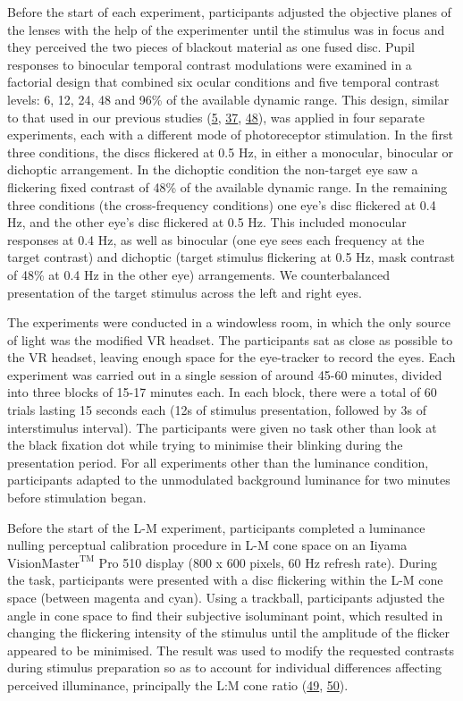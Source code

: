 \documentclass[
]{article}
\begin{document}
Before the start of each experiment, participants adjusted the objective planes of the lenses with the help of the experimenter until the stimulus was in focus and they perceived the two pieces of blackout material as one fused disc. Pupil responses to binocular temporal contrast modulations were examined in a factorial design that combined six ocular conditions and five temporal contrast levels: 6, 12, 24, 48 and 96\% of the available dynamic range. This design, similar to that used in our previous studies (\protect\hyperlink{ref-Segala2023}{5}, \protect\hyperlink{ref-Baker2017}{37}, \protect\hyperlink{ref-Baker2020}{48}), was applied in four separate experiments, each with a different mode of photoreceptor stimulation. In the first three conditions, the discs flickered at 0.5 Hz, in either a monocular, binocular or dichoptic arrangement. In the dichoptic condition the non-target eye saw a flickering fixed contrast of 48\% of the available dynamic range. In the remaining three conditions (the cross-frequency conditions) one eye's disc flickered at 0.4 Hz, and the other eye's disc flickered at 0.5 Hz. This included monocular responses at 0.4 Hz, as well as binocular (one eye sees each frequency at the target contrast) and dichoptic (target stimulus flickering at 0.5 Hz, mask contrast of 48\% at 0.4 Hz in the other eye) arrangements. We counterbalanced presentation of the target stimulus across the left and right eyes.

The experiments were conducted in a windowless room, in which the only source of light was the modified VR headset. The participants sat as close as possible to the VR headset, leaving enough space for the eye-tracker to record the eyes. Each experiment was carried out in a single session of around 45-60 minutes, divided into three blocks of 15-17 minutes each. In each block, there were a total of 60 trials lasting 15 seconds each (12s of stimulus presentation, followed by 3s of interstimulus interval). The participants were given no task other than look at the black fixation dot while trying to minimise their blinking during the presentation period. For all experiments other than the luminance condition, participants adapted to the unmodulated background luminance for two minutes before stimulation began.

Before the start of the L-M experiment, participants completed a luminance nulling perceptual calibration procedure in L-M cone space on an Iiyama \(\textrm{VisionMaster}^{\textrm{TM}}\) Pro 510 display (800 x 600 pixels, 60 Hz refresh rate). During the task, participants were presented with a disc flickering within the L-M cone space (between magenta and cyan). Using a trackball, participants adjusted the angle in cone space to find their subjective isoluminant point, which resulted in changing the flickering intensity of the stimulus until the amplitude of the flicker appeared to be minimised. The result was used to modify the requested contrasts during stimulus preparation so as to account for individual differences affecting perceived illuminance, principally the L:M cone ratio (\protect\hyperlink{ref-Carroll2002}{49}, \protect\hyperlink{ref-Hofer2005}{50}).
\end{document}
